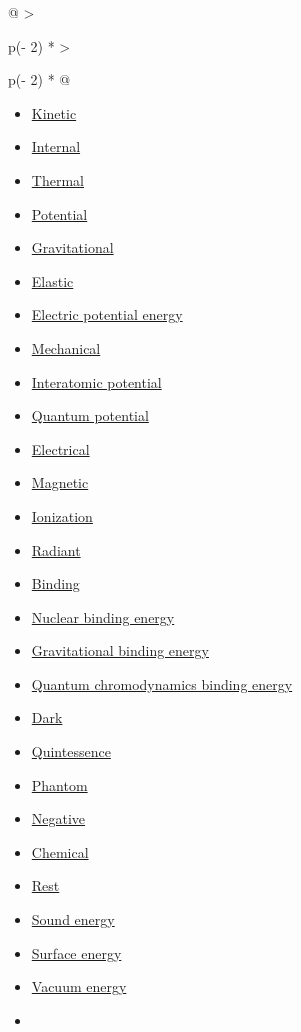 \documentclass[
]{article}
\providecommand{\tightlist}{%
  \setlength{\itemsep}{0pt}\setlength{\parskip}{0pt}}
\newenvironment{LTR}{\beginL}{\endL}
\begin{document}
\begin{LTR}
\begin{otherlanguage}{english}
\begin{longtable}[]{@{}
  >{\raggedright\arraybackslash}p{(\columnwidth - 2\tabcolsep) * }
  >{\raggedright\arraybackslash}p{(\columnwidth - 2\tabcolsep) * }@{}}
\begin{minipage}[t]{\linewidth}
\begin{itemize}
\tightlist
\item
  \href{/wiki/Kinetic_energy}{Kinetic}
\item
  \href{/wiki/Internal_energy}{Internal}
\item
  \href{/wiki/Thermal_energy}{Thermal}
\item
  \href{/wiki/Potential_energy}{Potential}
\item
  \href{/wiki/Gravitational_energy}{Gravitational}
\item
  \href{/wiki/Elastic_energy}{Elastic}
\item
  \href{/wiki/Electric_potential_energy}{Electric potential energy}
\item
  \href{/wiki/Mechanical_energy}{Mechanical}
\item
  \href{/wiki/Interatomic_potential}{Interatomic potential}
\item
  \href{/wiki/Quantum_potential}{Quantum potential}
\item
  \href{/wiki/Electrical_energy}{Electrical}
\item
  \href{/wiki/Magnetic_energy}{Magnetic}
\item
  \href{/wiki/Ionization_energy}{Ionization}
\item
  \href{/wiki/Radiant_energy}{Radiant}
\item
  \href{/wiki/Binding_energy}{Binding}
\item
  \href{/wiki/Nuclear_binding_energy}{Nuclear binding energy}
\item
  \href{/wiki/Gravitational_binding_energy}{Gravitational binding
  energy}
\item
  \href{/wiki/Quantum_chromodynamics_binding_energy}{Quantum
  chromodynamics binding energy}
\item
  \href{/wiki/Dark_energy}{Dark}
\item
  \href{/wiki/Quintessence_(physics)}{Quintessence}
\item
  \href{/wiki/Phantom_energy}{Phantom}
\item
  \href{/wiki/Negative_energy}{Negative}
\item
  \href{/wiki/Chemical_energy}{Chemical}
\item
  \href{/wiki/Rest_energy}{Rest}
\item
  \href{/wiki/Sound_energy}{Sound energy}
\item
  \href{/wiki/Surface_energy}{Surface energy}
\item
  \href{/wiki/Vacuum_energy}{Vacuum energy}
\item

\end{itemize}
\end{minipage}
\end{longtable}
\end{otherlanguage}
\end{LTR}
\end{document}
